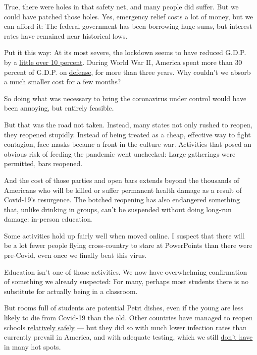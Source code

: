True, there were holes in that safety net, and many people did suffer.
But we could have patched those holes. Yes, emergency relief costs a lot
of money, but we can afford it: The federal government has been
borrowing huge sums, but interest rates have remained near historical
lows.

Put it this way: At its most severe, the lockdown seems to have reduced
G.D.P. by a
\href{https://www.newyorkfed.org/research/policy/weekly-economic-index}{little
over 10 percent}. During World War II, America spent more than 30
percent of G.D.P. on
\href{https://eh.net/encyclopedia/the-american-economy-during-world-war-ii/}{defense},
for more than three years. Why couldn't we absorb a much smaller cost
for a few months?

So doing what was necessary to bring the coronavirus under control would
have been annoying, but entirely feasible.

But that was the road not taken. Instead, many states not only rushed to
reopen, they reopened stupidly. Instead of being treated as a cheap,
effective way to fight contagion, face masks became a front in the
culture war. Activities that posed an obvious risk of feeding the
pandemic went unchecked: Large gatherings were permitted, bars reopened.

And the cost of those parties and open bars extends beyond the thousands
of Americans who will be killed or suffer permanent health damage as a
result of Covid-19's resurgence. The botched reopening has also
endangered something that, unlike drinking in groups, can't be suspended
without doing long-run damage: in-person education.

Some activities hold up fairly well when moved online. I suspect that
there will be a lot fewer people flying cross-country to stare at
PowerPoints than there were pre-Covid, even once we finally beat this
virus.

Education isn't one of those activities. We now have overwhelming
confirmation of something we already suspected: For many, perhaps most
students there is no substitute for actually being in a classroom.

But rooms full of students are potential Petri dishes, even if the young
are less likely to die from Covid-19 than the old. Other countries have
managed to reopen schools
\href{https://www.nytimes3xbfgragh.onion/2020/07/11/health/coronavirus-schools-reopen.html}{relatively
safely} --- but they did so with much lower infection rates than
currently prevail in America, and with adequate testing, which we still
\href{https://abcnews.go.com/Health/13-states-now-report-coronavirus-testing-issues-echo/story?id=71698974}{don't
have} in many hot spots.

